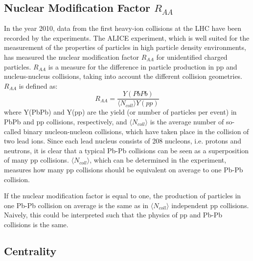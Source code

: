 \documentclass{article}
\begin{document}
\subsection{Nuclear Modification Factor $R_{AA}$}
In the year 2010, data from the first heavy-ion collisions at the LHC have 
been recorded by the experiments. The ALICE experiment, which is well suited 
for the measurement of the properties of particles in high particle density 
environments, has measured the nuclear modification factor $R_{AA}$ for 
unidentified charged particles. $R_{AA}$ is a measure for the difference in 
particle production in pp and nucleus-nucleus collisions, taking into account 
the different collision geometries. $R_{AA}$ is defined as:
\begin{equation}
R_{AA} = \frac{Y(PbPb)}{\langle N_{coll}\rangle Y(pp)}
\end{equation}
where Y(PbPb) and Y(pp) are the yield (or number of particles per event)
in PbPb and pp collisions, respectively, and $\langle N_{coll}\rangle$ is
the average number of so-called binary nucleon-nucleon collisions, which have 
taken place in the collision of two lead ions. Since each lead nucleus consists
of 208 nucleons, i.e. protons and neutrons, it is clear that a typical Pb-Pb
collisions can be seen as a superposition of many pp collisions. 
$\langle N_{coll}\rangle$, which can be determined in the experiment, measures 
how many pp collisions should be equivalent on average to one Pb-Pb collision.

If the nuclear modification factor is equal to one, the production of 
particles in one Pb-Pb collision on average is the same as in 
$\langle N_{coll}\rangle$ independent pp collisions. Naively, this could
be interpreted such that the physics of pp and Pb-Pb collisions is the
same.

\subsection{Centrality}
\end{document}

